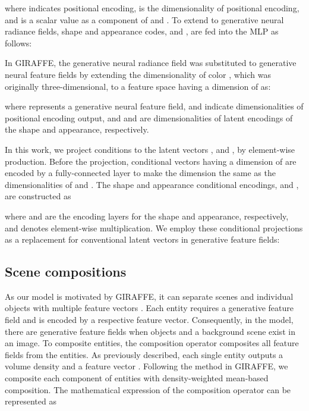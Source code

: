 \documentclass[nohyperref]{article}
\theoremstyle{plain}
\theoremstyle{definition}
\theoremstyle{remark}
\begin{document}
where  indicates positional encoding,  is the dimensionality of positional encoding, and  is a scalar value as a component of  and . To extend to generative neural radiance fields, shape and appearance codes,  and , are fed into the MLP as follows:



In GIRAFFE, the generative neural radiance field was substituted to generative neural feature fields by extending the dimensionality of color \cite{niemeyer2021giraffe}, which was originally three-dimensional, to a feature space having a dimension of  as:





where  represents a generative neural feature field,  and  indicate dimensionalities of positional encoding output, and  and  are dimensionalities of latent encodings of the shape and appearance, respectively.

In this work, we project conditions to the latent vectors \cite{cgan_proj},  and , by element-wise production. Before the projection, conditional vectors  having a dimension of  are encoded by a fully-connected layer to make the dimension the same as the dimensionalities of  and . The shape and appearance conditional encodings,  and , are constructed as

where  and  are the encoding layers for the shape and appearance, respectively, and  denotes element-wise multiplication. We employ these conditional projections as a replacement for conventional latent vectors in generative feature fields:







\subsection{Scene compositions}
As our model is motivated by GIRAFFE, it can separate scenes and individual objects with multiple feature vectors \cite{niemeyer2021giraffe}. Each entity requires a generative feature field and is encoded by a respective feature vector. Consequently, in the model, there are  generative feature fields when  objects and a background scene exist in an image. To composite  entities, the composition operator  composites all feature fields from the  entities. As previously described, each single entity  outputs a volume density  and a feature vector . Following the method in GIRAFFE, we composite each component of entities with density-weighted mean-based composition. The mathematical expression of the composition operator can be represented as
\end{document}
